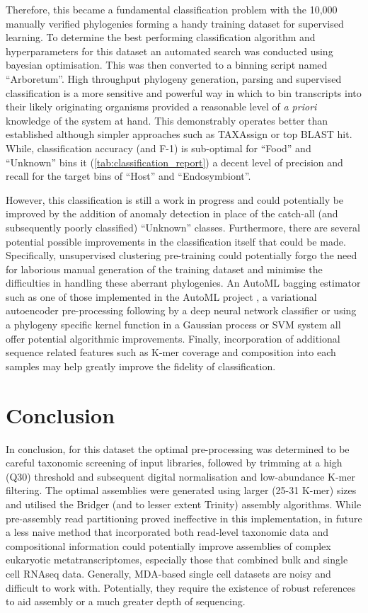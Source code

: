 Therefore, this became a fundamental classification problem with the 10,000 manually verified phylogenies
forming a handy training dataset for supervised learning.   To determine the best performing
classification algorithm and hyperparameters for this dataset an automated search was conducted 
using bayesian optimisation.  This was then converted to a binning script named ``Arboretum''.
High throughput phylogeny generation, parsing and supervised classification is 
a more sensitive and powerful way in which to bin transcripts into their likely originating
organisms provided a reasonable level of \textit{a priori} knowledge of the system at hand.
This demonstrably operates better than established although simpler approaches such as
TAXAssign or top BLAST hit.  While, classification accuracy (and F-1) is sub-optimal 
for ``Food'' and ``Unknown'' bins it (\cref{tab:classification_report}) a decent level of 
precision and recall for the target bins of ``Host'' and ``Endosymbiont''.

However, this classification
is still a work in progress and could potentially be improved by the 
addition of anomaly detection in place of the catch-all (and subsequently poorly classified)
``Unknown'' classes.  Furthermore, there are several potential possible improvements
in the classification itself that could be made.
Specifically, unsupervised clustering pre-training could potentially
forgo the need for laborious manual generation of the training dataset and minimise 
the difficulties in handling these aberrant phylogenies.
An AutoML bagging estimator such as one of those implemented in the AutoML project \citep{Eggensperger2013}, a variational autoencoder pre-processing following by a deep neural network classifier or using a phylogeny specific kernel function \citep{Vert2002} in a Gaussian process or
SVM system all offer potential algorithmic improvements.
Finally, incorporation of additional sequence related features such as
K-mer coverage and composition into each samples may help greatly improve
the fidelity of classification.

\section{Conclusion}
In conclusion, for this dataset the optimal pre-processing
was determined to be careful taxonomic screening of input libraries,
followed by trimming at a high (Q30) threshold and subsequent
digital normalisation and low-abundance K-mer filtering. 
The optimal assemblies were generated using larger (25-31 K-mer)
sizes and utilised the Bridger (and to lesser extent Trinity)
assembly algorithms.  While pre-assembly read partitioning proved 
ineffective in this implementation, in future a less naive
method that incorporated both read-level taxonomic data and
compositional information could potentially improve assemblies of 
complex eukaryotic metatranscriptomes, especially those that
combined bulk and single cell RNAseq data.  Generally,
MDA-based single cell datasets are noisy and difficult to work with.
Potentially, they require the existence of robust references to aid
assembly or a much greater depth of sequencing.

